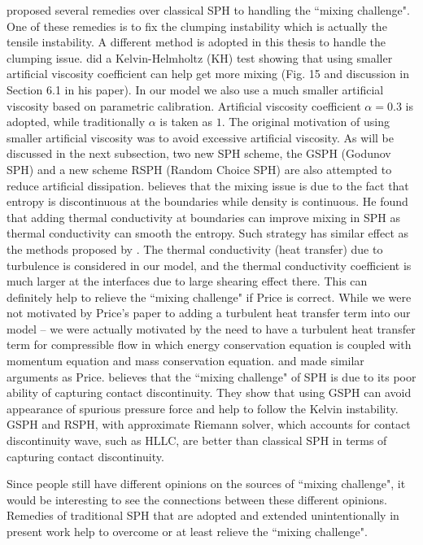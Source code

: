 \citet{read2010resolving} proposed several remedies over classical SPH to handling the ``mixing challenge". One of these remedies is to fix the clumping instability which is actually the tensile instability. A different method \citep{chen1999improvement} is adopted in this thesis to handle the clumping issue. \citet{agertz2007fundamental} did a Kelvin-Helmholtz (KH) test showing that using smaller artificial viscosity coefficient can help get more mixing (Fig. 15 and discussion in Section 6.1 in his paper). In our model we also use a much smaller artificial viscosity based on parametric calibration. Artificial viscosity coefficient $\alpha =0.3$ is adopted, while traditionally $\alpha$ is taken as $1$. The original motivation of using smaller artificial viscosity was to avoid excessive artificial viscosity. As will be discussed in the next subsection, two new SPH scheme, the GSPH (Godunov SPH) and a new scheme RSPH (Random Choice SPH) are also attempted to reduce artificial dissipation. \citet{price2008modelling} believes that the mixing issue is due to the fact that entropy is discontinuous at the boundaries while density is continuous. He found that adding thermal conductivity at boundaries can improve mixing in SPH as thermal conductivity can smooth the entropy. Such strategy has similar effect as the methods proposed by \citet{read2010resolving}. The thermal conductivity (heat transfer) due to turbulence is considered in our model, and the thermal conductivity coefficient is much larger at the interfaces due to large shearing effect there. This can definitely help to relieve the ``mixing challenge" if Price is correct. While we were not motivated by Price's paper to adding a turbulent heat transfer term into our model -- we were actually motivated by the need to have a turbulent heat transfer term for compressible flow in which energy conservation equation is coupled with momentum equation and mass conservation equation.
\citet{wadsley2008treatment} and \citet{ritchie2001multiphase} made similar arguments as Price. \citet{borgani2012hydrodynamic} believes that the ``mixing challenge" of SPH is due to its poor ability of capturing contact discontinuity. They show that using GSPH can avoid appearance of spurious pressure force and help to follow the Kelvin instability. GSPH and RSPH, with approximate Riemann solver, which accounts for contact discontinuity wave, such as HLLC, are better than classical SPH in terms of capturing contact discontinuity.

Since people still have different opinions on the sources of ``mixing challenge", it would be interesting to see the connections between these different opinions. Remedies of traditional SPH that are adopted and extended unintentionally in present work help to overcome or at least relieve the ``mixing challenge".

